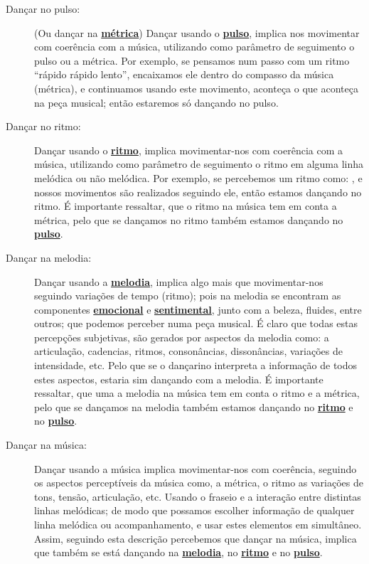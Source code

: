\begin{description}
\item[Dançar no pulso:] (Ou dançar na \hyperref[def:Metrica]{\textbf{métrica}}) 
Dançar usando o \hyperref[ref:Pulso]{\textbf{pulso}}, 
implica nos movimentar com coerência com a música, 
utilizando como parâmetro de seguimento o pulso ou a métrica.
Por exemplo, se pensamos num passo com um ritmo ``rápido rápido lento'',
encaixamos ele dentro do compasso da música (métrica), e continuamos usando este movimento,
aconteça o que aconteça na peça musical;
então estaremos só dançando no pulso.
\item[Dançar no ritmo:] Dançar usando o \hyperref[sec:pos:Ritmo]{\textbf{ritmo}},
implica movimentar-nos com coerência com a música, 
utilizando como parâmetro de seguimento 
o ritmo em alguma linha melódica ou não melódica.
Por exemplo, se percebemos  um ritmo como: \Vier \Acht \Vier  \Acht \Vier \Halb,
e nossos movimentos são realizados seguindo ele, então estamos dançando no ritmo.
É importante ressaltar, que o ritmo na música tem em conta a métrica,
pelo que se dançamos no ritmo também estamos dançando no \hyperref[ref:Pulso]{\textbf{pulso}}.  
\item[Dançar na melodia:] Dançar usando a \hyperref[sec:pos:Melodia]{\textbf{melodia}},
implica algo mais que movimentar-nos seguindo variações de tempo (ritmo); 
pois na melodia se encontram as componentes \hyperref[ref:emotionsentimental]{\textbf{emocional}} 
e \hyperref[ref:emotionsentimental]{\textbf{sentimental}}, junto com a beleza, fluides, entre outros; 
que podemos perceber numa peça musical.
É claro que todas estas percepções subjetivas, 
são gerados por aspectos da melodia como: a articulação, cadencias, ritmos, consonâncias, dissonâncias,
variações de intensidade, etc. 
Pelo que se o dançarino interpreta a informação de todos estes aspectos,
estaria sim dançando com a melodia.
É importante ressaltar, que uma a melodia na música tem em conta o ritmo e a métrica,
pelo que se dançamos na melodia também estamos dançando no \hyperref[sec:pos:Ritmo]{\textbf{ritmo}} e
no \hyperref[ref:Pulso]{\textbf{pulso}}.
\item[Dançar na música:] 
Dançar usando a música implica movimentar-nos com coerência, 
seguindo os aspectos perceptíveis da música como, a métrica, 
o ritmo as variações de tons, tensão, articulação, etc.
Usando o fraseio e a interação entre distintas linhas melódicas;
de modo que possamos escolher informação de qualquer linha melódica ou acompanhamento,
e usar estes elementos em simultâneo.
Assim, seguindo esta descrição percebemos que dançar na música, 
implica que também se está dançando na \hyperref[sec:pos:Melodia]{\textbf{melodia}}, 
no \hyperref[sec:pos:Ritmo]{\textbf{ritmo}} e 
no \hyperref[ref:Pulso]{\textbf{pulso}}.
\end{description}~


